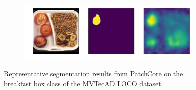\begin{figure}[htbp]
\begin{subfigure}[b]{0.3\textwidth}
    \end{subfigure}
    \begin{subfigure}[b]{0.3\textwidth}
        \centering
        \includegraphics[width=\textwidth]{figures/locopatchcoreresults/breakfast_box_test_structural_anomalies_070.png}


    \end{subfigure}
    \caption{Representative segmentation results from PatchCore \cite{patchCore2022} on the breakfast box class of the MVTecAD LOCO \cite{LOCODentsAndScratchesBergmann2022} dataset.}
    \label{fig:PCBB}
\end{figure}